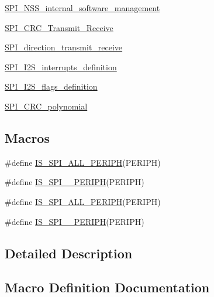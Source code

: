 \begin{DoxyCompactItemize}
\hyperlink{group___s_p_i___n_s_s__internal__software__management}{S\+P\+I\+\_\+\+N\+S\+S\+\_\+internal\+\_\+software\+\_\+management}
\item 
\hyperlink{group___s_p_i___c_r_c___transmit___receive}{S\+P\+I\+\_\+\+C\+R\+C\+\_\+\+Transmit\+\_\+\+Receive}
\item 
\hyperlink{group___s_p_i__direction__transmit__receive}{S\+P\+I\+\_\+direction\+\_\+transmit\+\_\+receive}
\item 
\hyperlink{group___s_p_i___i2_s__interrupts__definition}{S\+P\+I\+\_\+\+I2\+S\+\_\+interrupts\+\_\+definition}
\item 
\hyperlink{group___s_p_i___i2_s__flags__definition}{S\+P\+I\+\_\+\+I2\+S\+\_\+flags\+\_\+definition}
\item 
\hyperlink{group___s_p_i___c_r_c__polynomial}{S\+P\+I\+\_\+\+C\+R\+C\+\_\+polynomial}
\end{DoxyCompactItemize}
\subsection*{Macros}
\begin{DoxyCompactItemize}
\item 
\#define \hyperlink{group___s_p_i___exported___constants_gaf54f84a30a5914b54dbfdc186720d0ba}{I\+S\+\_\+\+S\+P\+I\+\_\+\+A\+L\+L\+\_\+\+P\+E\+R\+I\+PH}(P\+E\+R\+I\+PH)
\item 
\#define \hyperlink{group___s_p_i___exported___constants_gae2222c673a036497587b8791f89428d0}{I\+S\+\_\+\+S\+P\+I\+\_\+\_\+\+P\+E\+R\+I\+PH}(P\+E\+R\+I\+PH)
\item 
\#define \hyperlink{group___s_p_i___exported___constants_gaf54f84a30a5914b54dbfdc186720d0ba}{I\+S\+\_\+\+S\+P\+I\+\_\+\+A\+L\+L\+\_\+\+P\+E\+R\+I\+PH}(P\+E\+R\+I\+PH)
\item 
\#define \hyperlink{group___s_p_i___exported___constants_gae2222c673a036497587b8791f89428d0}{I\+S\+\_\+\+S\+P\+I\+\_\+\_\+\+P\+E\+R\+I\+PH}(P\+E\+R\+I\+PH)
\end{DoxyCompactItemize}


\subsection{Detailed Description}


\subsection{Macro Definition Documentation}
